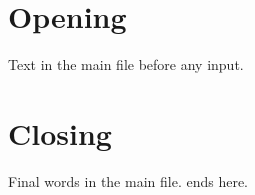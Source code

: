 \documentclass{report}
\begin{document}
\tableofcontents

\chapter{Opening}
Text in the main file before any input.






\chapter{Closing}

Final words in the main file. \projectname{} ends here.
\end{document}

